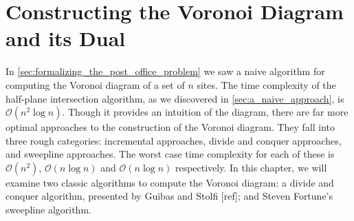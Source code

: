 \documentclass[12pt,twoside]{reedthesis}
\begin{document}
  
  




  \chapter*{Constructing the Voronoi Diagram and its Dual}
    \setcounter{chapter}{3}
    \setcounter{section}{0}
    In \cref{sec:formalizing_the_post_office_problem} we saw a naive algorithm for computing the Voronoi diagram of a set of $n$ sites. The time complexity of the half-plane intersection algorithm, as we discovered in \cref{sec:a_naive_approach}, is $\mathcal{O}(n^{2}\log n)$. Though it provides an intuition of the diagram, there are far more optimal approaches to the construction of the Voronoi diagram. They fall into three rough categories: incremental approaches, divide and conquer approaches, and sweepline approaches. The worst case time complexity for each of these is $\mathcal{O}(n^{2})$, $\mathcal{O}(n\log n)$ and $\mathcal{O}(n\log n)$ respectively. In this chapter, we will examine two classic algorithms to compute the Voronoi diagram: a divide and conquer algorithm, presented by Guibas and Stolfi [ref]; and Steven Fortune's sweepline algorithm. \par
    
\end{document}
